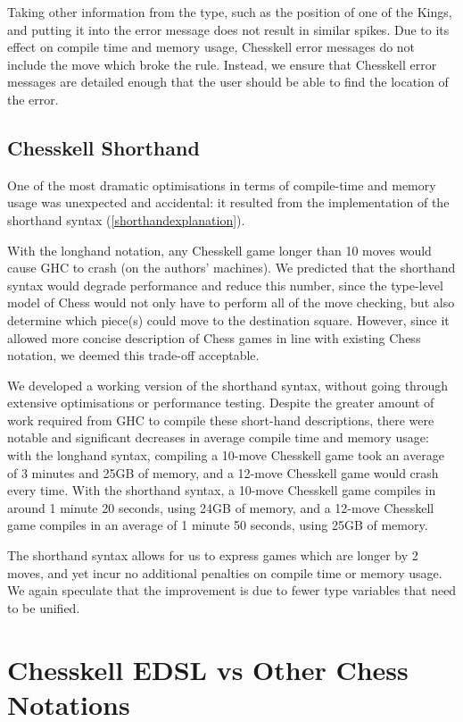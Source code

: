 Taking other information from the  type, such as the position of one of the Kings, and putting it into the error message does not result in similar spikes. Due to its effect on compile time and memory usage, Chesskell error messages do not include the move which broke the rule. Instead, we ensure that Chesskell error messages are detailed enough that the user should be able to find the location of the error.

\subsection{Chesskell Shorthand} \label{shorthand}

One of the most dramatic optimisations in terms of compile-time and memory usage was unexpected and accidental: it resulted from the implementation of the shorthand syntax (\cref{shorthandexplanation}).

With the longhand notation, any Chesskell game longer than 10 moves would cause GHC to crash (on the authors' machines). We predicted that the shorthand syntax would degrade performance and reduce this number, since the type-level model of Chess would not only have to perform all of the move checking, but also determine which piece(s) could move to the destination square. However, since it allowed more concise description of Chess games in line with existing Chess notation, we deemed this trade-off acceptable.

We developed a working version of the shorthand syntax, without going through extensive optimisations or performance testing. Despite the greater amount of work required from GHC to compile these short-hand descriptions, there were notable and significant decreases in average compile time and memory usage: with the longhand syntax, compiling a 10-move Chesskell game took an average of 3 minutes and 25GB of memory, and a 12-move Chesskell game would crash every time. With the shorthand syntax, a 10-move Chesskell game compiles in around 1 minute 20 seconds, using 24GB of memory, and a 12-move Chesskell game compiles in an average of 1 minute 50 seconds, using 25GB of memory.

The shorthand syntax allows for us to express games which are longer by 2 moves, and yet incur no additional penalties on compile time or memory usage. We again speculate that the improvement is due to fewer type variables that need to be unified.

\section{Chesskell EDSL vs Other Chess Notations}

